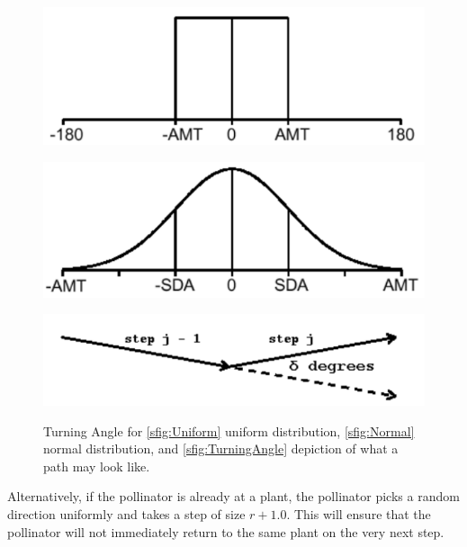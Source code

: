 \begin{figure}[h!]
  \begin{center}
    \begin{minipage}[b]{0.48\textwidth}
      \includegraphics[scale=0.4]{UniformTADistribution.pdf}
       \label{sfig:Uniform}
    \end{minipage}
    \begin{minipage}[b]{0.48\textwidth}
      \includegraphics[scale=0.4]{NormalTADistribution.pdf}
       \label{sfig:Normal}
    \end{minipage}
    \includegraphics[scale=0.5]{TurningAngle.pdf}
     \label{sfig:TurningAngle}
  \end{center}
  \caption{Turning Angle for \ref{sfig:Uniform} uniform distribution,
  \ref{sfig:Normal} normal distribution, and \ref{sfig:TurningAngle} depiction
  of what a path may look like.}\label{TurningAngle}
\end{figure}

Alternatively, if the pollinator is already at a plant, the pollinator picks a
random direction uniformly and takes a step of size $r+1.0$.  This will ensure
that the pollinator will not immediately return to the same plant on the very
next step.

